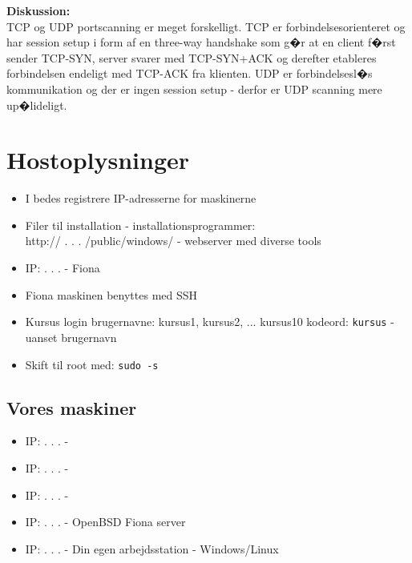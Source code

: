 \documentclass[a4paper,11pt,notitlepage]{oevelser}
\begin{document}
{\bfseries Diskussion:}\\
TCP og UDP portscanning er meget forskelligt. TCP er
forbindelsesorienteret og har session setup i form af en three-way
handshake som g�r at en client f�rst sender TCP-SYN, server svarer med
TCP-SYN+ACK og derefter etableres forbindelsen endeligt med TCP-ACK fra
klienten. UDP er forbindelsesl�s kommunikation og der er ingen session
setup - derfor er UDP scanning mere up�lideligt.




\appendix
\rhead{\fancyplain{}{\bfseries\leftmark}}
\normal




\chapter{Hostoplysninger}

\begin{itemize}
\item I bedes registrere IP-adresserne for maskinerne
\item Filer til installation - installationsprogrammer:\\
http:// \hskip 15mm .\hskip 15mm .\hskip 15mm .\hskip 15mm
/public/windows/ - webserver med diverse tools
\item IP: \hskip 15mm .\hskip 15mm .\hskip 15mm .\hskip 15mm - Fiona
\item Fiona maskinen benyttes med SSH
\item Kursus login brugernavne: kursus1, kursus2, ... kursus10
kodeord: \verb+kursus+ - uanset brugernavn
\item Skift til root med: \verb+sudo -s+
\end{itemize}

\section*{Vores maskiner}
\begin{itemize}
\item IP: \hskip 15mm .\hskip 15mm .\hskip 15mm .\hskip 15mm -
\item IP: \hskip 15mm .\hskip 15mm .\hskip 15mm .\hskip 15mm -
\item IP: \hskip 15mm .\hskip 15mm .\hskip 15mm .\hskip 15mm -
\item IP: \hskip 15mm .\hskip 15mm .\hskip 15mm .\hskip 15mm -
  OpenBSD Fiona server
\item IP: \hskip 15mm .\hskip 15mm .\hskip 15mm .\hskip 15mm - Din egen
  arbejdsstation - Windows/Linux
\end{itemize}
\end{document}
